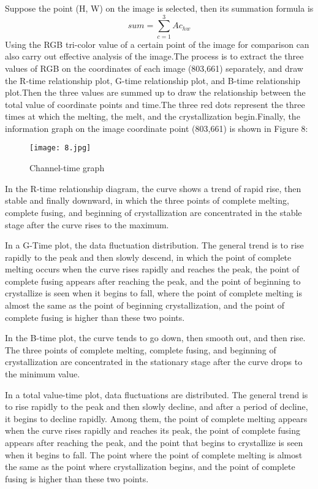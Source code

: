\documentclass[12pt]{apmcmthesis}
\begin{document}
Suppose the point (H, W) on the image is selected, then its summation formula is
$$sum =  \sum_{c=1}^{3} A c_{hw}$$
Using the RGB tri-color value of a certain point of the image for comparison can also carry out effective analysis of the image.The process is to extract the three values of RGB on the coordinates of each image (803,661) separately, and draw the R-time relationship plot, G-time relationship plot, and B-time relationship plot.Then the three values are summed up to draw the relationship between the total value of coordinate points and time.The three red dots represent the three times at which the melting, the melt, and the crystallization begin.Finally, the information graph on the image coordinate point (803,661) is shown in Figure 8:
\begin{figure}[htbp]
	\centering
	\texttt{[image: 8.jpg]}
	\caption{Channel-time graph}
	\label{a}
\end{figure}
In the R-time relationship diagram, the curve shows a trend of rapid rise, then stable and finally downward, in which the three points of complete melting, complete fusing, and beginning of crystallization are concentrated in the stable stage after the curve rises to the maximum.

In a G-Time plot, the data  fluctuation distribution. The general trend is to rise rapidly to the peak and then slowly descend, in which the point of complete melting occurs when the curve rises rapidly and reaches the peak, the point of complete fusing appears after reaching the peak, and the point of beginning to crystallize is seen when it begins to fall, where the point of complete melting is almost the same as the point of beginning crystallization, and the point of complete fusing is higher than these two points.

In the B-time plot, the curve tends to go down, then smooth out, and then rise. The three points of complete melting, complete fusing, and beginning of crystallization are concentrated in the stationary stage after the curve drops to the minimum value.

In a total value-time plot, data fluctuations are distributed. The general trend is to rise rapidly to the peak and then slowly decline, and after a period of decline, it begins to decline rapidly. Among them, the point of complete melting appears when the curve rises rapidly and reaches its peak, the point of complete fusing appears after reaching the peak, and the point that begins to crystallize is seen when it begins to fall. The point where the point of complete melting is almost the same as the point where crystallization begins, and the point of complete fusing is higher than these two points.
\end{document}
